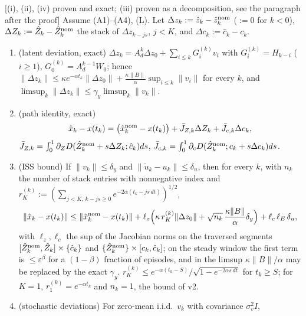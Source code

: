 \begin{proposition}\label{prop:m3-iss}
 [(i), (ii), (iv) proven and exact;
(iii) proven as a decomposition, see the paragraph after the proof] Assume (A1)--(A4), (L). Let
$\Delta z_k:=\hat z_k-\hat z^{\rm nom}_k$ ($:=0$ for $k<0$), $\Delta Z_k:=\hat Z_k-\hat Z^{\rm nom}_k$ the stack of
$\Delta z_{k-js}$, $j<K$, and $\Delta c_k:=\hat c_k-c_k$.
\begin{enumerate}[label=(\roman*)]
\item (latent deviation, exact) $\Delta z_k=A_d^k\Delta z_0+\sum_{i\le k}G^{(k)}_iv_i$ with
$G^{(k)}_i=H_{k-i}$ ($i\ge1$), $G^{(k)}_0=A_d^{k-1}W_0$; hence
$\|\Delta z_k\|\le\kappa e^{-\alpha t_k}\|\Delta z_0\|+\frac{\kappa\|B\|}{\alpha}\sup_{i\le k}\|v_i\|$ for every $k$,
and $\limsup_k\|\Delta z_k\|\le\gamma_y\limsup_k\|v_k\|$.
\item (path identity, exact)
\begin{equation}\label{eq:m3-identity}
\hat x_k-x(t_k)=\big(\hat x^{\rm nom}_k-x(t_k)\big)+\bar J_{Z,k}\Delta Z_k+\bar J_{c,k}\Delta c_k,
\end{equation}
$\bar J_{Z,k}=\int_0^1\partial_ZD(\hat Z^{\rm nom}_k+s\Delta Z_k;\hat c_k)ds$,
$\bar J_{c,k}=\int_0^1\partial_cD(\hat Z^{\rm nom}_k;c_k+s\Delta c_k)ds$.
\item (ISS bound) If $\|v_k\|\le\delta_y$ and $\|\tilde u_k-u_k\|\le\delta_u$, then for every $k$, with $n_k$ the number of
stack entries with nonnegative index and $r^{(k)}_K:=(\sum_{j<K,\,k-js\ge0}e^{-2\alpha(t_k-js\,dt)})^{1/2}$,
\begin{equation}\label{eq:m3-iss}
\|\hat x_k-x(t_k)\|\le\|\hat x^{\rm nom}_k-x(t_k)\|+\ell_z\Big(\kappa\,r^{(k)}_K\|\Delta z_0\|+\sqrt{n_k}\,\frac{\kappa\|B\|}{\alpha}\delta_y\Big)+\ell_c\,\ell_E\,\delta_u ,
\end{equation}
with $\ell_z,\ell_c$ the sup of the Jacobian norms on the traversed segments
$[\hat Z^{\rm nom}_k,\hat Z_k]\times\{\hat c_k\}$ and $\{\hat Z^{\rm nom}_k\}\times[c_k,\hat c_k]$; on the
steady window the first term is $\le\varepsilon^\beta$ for a $(1-\beta)$ fraction of episodes, and in
the limsup $\kappa\|B\|/\alpha$ may be replaced by the exact $\gamma_y$. $r^{(k)}_K\le e^{-\alpha(t_k-S)}/\sqrt{1-e^{-2\alpha s\,dt}}$
for $t_k\ge S$; for $K=1$, $r^{(k)}_1=e^{-\alpha t_k}$ and $n_k=1$, the bound of v2.
\item (stochastic deviations) For zero-mean i.i.d.\ $v_k$ with covariance $\sigma_v^2I$,

\end{enumerate}
\end{proposition}
